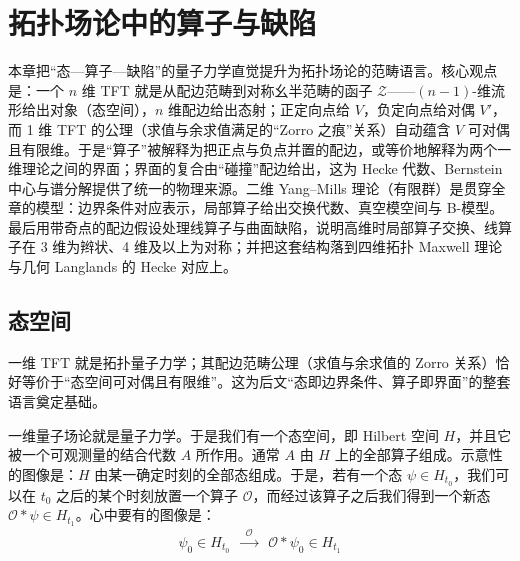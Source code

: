 \chapter{拓扑场论中的算子与缺陷}\label{ch:10}

\begin{keytakeaways}
本章把“态—算子—缺陷”的量子力学直觉提升为拓扑场论的范畴语言。核心观点是：一个 $n$ 维 TFT 就是从配边范畴到对称幺半范畴的函子 $\mathcal{Z}$——$(n-1)$-维流形给出对象（态空间），$n$ 维配边给出态射；正定向点给 $V$，负定向点给对偶 $V'$，而 1 维 TFT 的公理（求值与余求值满足的“Zorro 之痕”关系）自动蕴含 $V$ 可对偶且有限维。于是“算子”被解释为把正点与负点并置的配边，或等价地解释为两个一维理论之间的界面；界面的复合由“碰撞”配边给出，这为 Hecke 代数、Bernstein 中心与谱分解提供了统一的物理来源。二维 Yang--Mills 理论（有限群）是贯穿全章的模型：边界条件对应表示，局部算子给出交换代数、真空模空间与 B-模型。最后用带奇点的配边假设处理线算子与曲面缺陷，说明高维时局部算子交换、线算子在 3 维为辫状、4 维及以上为对称；并把这套结构落到四维拓扑 Maxwell 理论与几何 Langlands 的 Hecke 对应上。
\end{keytakeaways}

\section{态空间}\label{sec:10-1}

\begin{sectionkey}
一维 TFT 就是拓扑量子力学；其配边范畴公理（求值与余求值的 Zorro 关系）恰好等价于“态空间可对偶且有限维”。这为后文“态即边界条件、算子即界面”的整套语言奠定基础。
\end{sectionkey}

一维量子场论就是量子力学。于是我们有一个态空间，即 Hilbert 空间 $H$，并且它被一个可观测量的结合代数 $A$ 所作用。通常 $A$ 由 $H$ 上的全部算子组成。示意性的图像是：$H$ 由某一确定时刻的全部态组成。于是，若有一个态 $\psi\in H_{t_0}$，我们可以在 $t_0$ 之后的某个时刻放置一个算子 $\mathcal{O}$，而经过该算子之后我们得到一个新态 $\mathcal{O}*\psi\in H_{t_1}$。心中要有的图像是：
\begin{equation}\tag{10.1}
\begin{array}{ccc}
\psi_0\in H_{t_0} & \xrightarrow{\ \ \mathcal{O}\ \ } & \mathcal{O}*\psi_0\in H_{t_1}
\end{array}
\end{equation}

